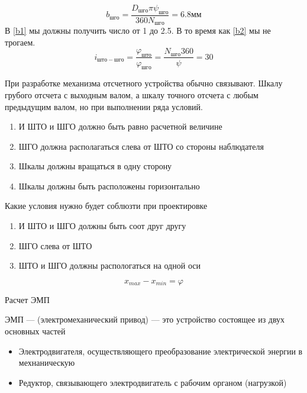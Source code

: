 \documentclass{article}
\begin{document}
\begin{enumerate}
\begin{enumerate}
		$$\label{b2}
		b_{шго} = \frac{D_{шго} \pi \psi_{шго}}{360 N_{шго}} = 6.8 мм
		$$
		В \ref{b1} мы должны получить число от 1 до 2.5. В то время как \ref{b2} мы не трогаем.
		$$
		i_{што-шго} = \frac{\varphi_{што}}{\varphi_{шго}} = \frac{N_{шго} 360}{ \psi}  = 30
		$$
		
		При разработке механизма отсчетного устройства обычно связывают. Шкалу грубого отсчета с выходным валом, а шкалу точного отсчета с любым предыдущим валом, но при выполнении ряда условий.
		\begin{enumerate}
			\item И ШТО и ШГО должно быть равно расчетной величине
			\item ШГО должна располагаться слева от ШТО со стороны наблюдателя
			\item Шкалы должны вращаться в одну сторону
			\item Шкалы должны быть расположены горизонтально
		\end{enumerate}
		Какие условия нужно будет соблюзти при проектировке
		\begin{enumerate}
			\item И ШТО и ШГО должны быть соот друг другу
			\item ШГО слева от ШТО
			\item ШТО и ШГО должны распологаться на одной оси
		\end{enumerate}
		$$
		x_{max} - x_{min} = \varphi
		$$
	\end{enumerate}
\end{enumerate}

Расчет ЭМП

ЭМП --- (электромеханический привод) --- это устройство состоящее из двух основных частей%
\begin{itemize}
	\item Электродвигателя, осуществляющего преобразование электрической энергии в мехнаническую
	\item Редуктор, связывающего электродвигатель с рабочим органом (нагрузкой)
\end{itemize}
\end{document}
